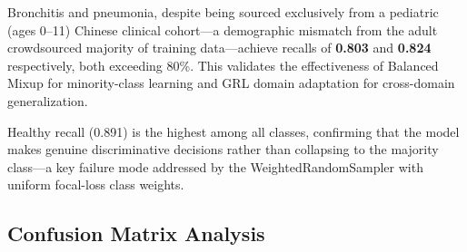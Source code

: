 \documentclass[10pt,journal,compsoc]{IEEEtran}
\begin{document}
Bronchitis and pneumonia, despite being sourced exclusively from a
pediatric (ages 0--11) Chinese clinical cohort---a demographic mismatch
from the adult crowdsourced majority of training data---achieve recalls
of \textbf{0.803} and \textbf{0.824} respectively, both exceeding 80\%.
This validates the effectiveness of Balanced Mixup for minority-class
learning and GRL domain adaptation for cross-domain generalization.

Healthy recall (0.891) is the highest among all classes, confirming
that the model makes genuine discriminative decisions rather than
collapsing to the majority class---a key failure mode addressed by
the WeightedRandomSampler with uniform focal-loss class weights.

\subsection{Confusion Matrix Analysis}
\end{document}
